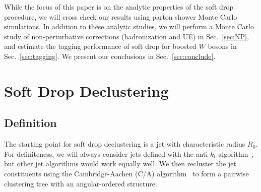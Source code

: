 \documentclass[letterpaper,11pt]{article}
\DeclareRobustCommand{\Sec}[1]{Sec.~\ref{#1}}
\begin{document}
While the focus of this paper is on the analytic properties of the soft drop procedure, we will cross check our results using parton shower Monte Carlo simulations.  In addition to these analytic studies, we will perform a Monte Carlo study of non-perturbative corrections (hadronization and UE) in \Sec{sec:NP}, and estimate the tagging performance of soft drop for boosted $W$ bosons in \Sec{sec:tagging}. We present our conclusions in \Sec{sec:conclude}.

\section{Soft Drop Declustering}
\label{sec:softdrop}

\subsection{Definition}
\label{sec:def}

The starting point for soft drop declustering is a jet with characteristic radius $R_0$.  For definiteness, we will always consider jets defined with the anti-$k_t$ algorithm~\cite{anti-kt}, but other jet algorithms would work equally well.  We then recluster the jet constituents using the Cambridge-Aachen (C/A) algorithm~\cite{Dokshitzer:1997in, Wobisch:1998wt} to form a pairwise clustering tree with an angular-ordered structure.
\end{document}
